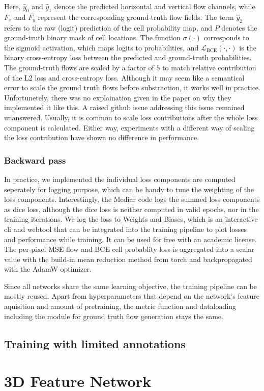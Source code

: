 Here, $\hat{y}_0$ and $\hat{y}_1$ denote the predicted horizontal and vertical flow channels, while $F_x$ and $F_y$ represent the corresponding ground-truth flow fields. The term $\hat{y}_2$ refers to the raw (logit) prediction of the cell probability map, and $P$ denotes the ground-truth binary mask of cell locations. The function $\sigma(\cdot)$ corresponds to the sigmoid activation, which maps logits to probabilities, and $\mathcal{L}_{\text{BCE}}(\cdot,\cdot)$ is the binary cross-entropy loss between the predicted and ground-truth probabilities. The ground-truth flows are scaled by a factor of $5$ to match relative contribution of the L2 loss and cross-entropy loss. Although it may seem like a semantical error to scale the ground truth flows before substraction, it works well in practice. Unfortunetely, there was no explaination given in the paper on why they implemented it like this. A raised github issue addressing this issue remained unanswered. Usually, it is common to scale loss contributions after the whole loss component is calculated. Either way, experiments with a different way of scaling the loss contribution have shown no difference in performance. 


\subsubsection{Backward pass}


In practice, we implemented the individual loss components are computed seperately for logging purpose, which can be handy to tune the weighting of the loss components. Interestingly, the Mediar code logs the summed loss components as dice loss, although the dice loss is neither computed in valid epochs, nor in the training iterations. We log the loss to Weights and Biases, which is an interactive cli and webtool that can be integrated into the training pipeline to plot losses and performance while training. It can be used for free with an academic license.
The per-pixel MSE flow and BCE cell probablity loss is aggregated into a scalar value with the build-in mean reduction method from torch and backpropagated with the AdamW optimizer.


Since all networks share the same learning objective, the training pipeline can be mostly reused. Apart from hyperparameters that depend on the network's feature aquisition and amount of pretraining, the metric function and dataloading including the module for ground truth flow generation stays the same.

\subsection{Training with limited annotations}

\section{3D Feature Network}




